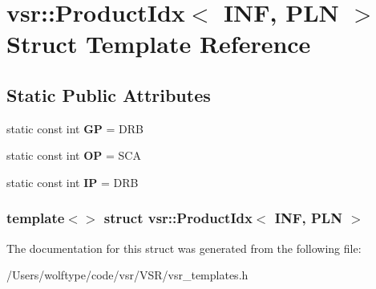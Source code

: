 \hypertarget{structvsr_1_1_product_idx_3_01_i_n_f_00_01_p_l_n_01_4}{\section{vsr\-:\-:Product\-Idx$<$ I\-N\-F, P\-L\-N $>$ Struct Template Reference}
\label{structvsr_1_1_product_idx_3_01_i_n_f_00_01_p_l_n_01_4}
}
\subsection*{Static Public Attributes}
\begin{DoxyCompactItemize}
\item 
\hypertarget{structvsr_1_1_product_idx_3_01_i_n_f_00_01_p_l_n_01_4_a88adee78d22cdc8f4b1c1e112b794fa1}{static const int {\bfseries G\-P} = D\-R\-B}\label{structvsr_1_1_product_idx_3_01_i_n_f_00_01_p_l_n_01_4_a88adee78d22cdc8f4b1c1e112b794fa1}

\item 
\hypertarget{structvsr_1_1_product_idx_3_01_i_n_f_00_01_p_l_n_01_4_ae318bce6ac34adfb2eae3e7a9d3722bb}{static const int {\bfseries O\-P} = S\-C\-A}\label{structvsr_1_1_product_idx_3_01_i_n_f_00_01_p_l_n_01_4_ae318bce6ac34adfb2eae3e7a9d3722bb}

\item 
\hypertarget{structvsr_1_1_product_idx_3_01_i_n_f_00_01_p_l_n_01_4_a071ed401e70718fe2c141dfe69b350bc}{static const int {\bfseries I\-P} = D\-R\-B}\label{structvsr_1_1_product_idx_3_01_i_n_f_00_01_p_l_n_01_4_a071ed401e70718fe2c141dfe69b350bc}

\end{DoxyCompactItemize}
\subsubsection*{template$<$$>$ struct vsr\-::\-Product\-Idx$<$ I\-N\-F, P\-L\-N $>$}



The documentation for this struct was generated from the following file\-:\begin{DoxyCompactItemize}
\item 
/\-Users/wolftype/code/vsr/\-V\-S\-R/vsr\-\_\-templates.\-h\end{DoxyCompactItemize}
